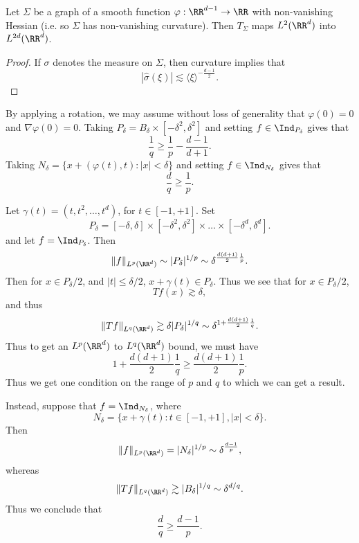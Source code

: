 \begin{theorem}
    Let $\Sigma$ be a graph of a smooth function $\varphi: \RR^{d-1} \to \RR$ with non-vanishing Hessian (i.e. so $\Sigma$ has non-vanishing curvature). Then $T_\Sigma$ maps $L^2(\RR^d)$ into $L^{2d}(\RR^d)$.
\end{theorem}
\begin{proof}
    If $\sigma$ denotes the measure on $\Sigma$, then curvature implies that
    \[ |\widehat{\sigma}(\xi)| \lesssim \langle \xi \rangle^{- \frac{d-1}{2}}. \]
\end{proof}

\begin{remark}
    By applying a rotation, we may assume without loss of generality that $\varphi(0) = 0$ and $\nabla \varphi(0) = 0$. Taking $P_\delta = B_\delta \times [-\delta^2, \delta^2]$ and setting $f \in \Ind_{P_\delta}$ gives that
    \[ \frac{1}{q} \geq \frac{1}{p} - \frac{d-1}{d+1}. \]
    Taking $N_\delta = \{ x + (\varphi(t),t) : |x| < \delta \}$ and setting $f \in \Ind_{N_\delta}$ gives that
    \[ \frac{d}{q} \geq \frac{1}{p}. \]
\end{remark}






\begin{example}
    Let $\gamma(t) = (t,t^2,\dots,t^d)$, for $t \in [-1,+1]$. Set
    \[ P_\delta = [-\delta,\delta] \times [-\delta^2,\delta^2] \times \dots \times [-\delta^d, \delta^d]. \]
    and let $f = \Ind_{P_\delta}$. Then
    \[ \| f \|_{L^p(\RR^d)} \sim |P_\delta|^{1/p} \sim \delta^{\frac{d(d+1)}{2} \frac{1}{p}}. \]
    Then for $x \in P_\delta / 2$, and $|t| \leq \delta / 2$, $x + \gamma(t) \in P_\delta$. Thus we see that for $x \in P_\delta / 2$,
    \[ Tf(x) \gtrsim \delta, \]
    and thus
    \[ \| Tf \|_{L^q(\RR^d)} \gtrsim \delta | P_\delta |^{1/q} \sim \delta^{1 + \frac{d(d+1)}{2} \frac{1}{q}}. \]
    Thus to get an $L^p(\RR^d)$ to $L^q(\RR^d)$ bound, we must have
    \[ 1 + \frac{d(d+1)}{2} \frac{1}{q} \geq \frac{d(d+1)}{2} \frac{1}{p}. \]
    Thus we get one condition on the range of $p$ and $q$ to which we can get a result.

    Instead, suppose that $f = \Ind_{N_\delta}$, where
    \[ N_\delta = \{ x + \gamma(t): t \in [-1,+1], |x| < \delta \}. \]
    Then
    \[ \| f \|_{L^p(\RR^d)} = |N_\delta|^{1/p} \sim \delta^{\frac{d-1}{p}}, \]
    whereas
    \[ \| Tf \|_{L^q(\RR^d)} \gtrsim |B_\delta|^{1/q} \sim \delta^{d/q}. \]
    Thus we conclude that
    \[ \frac{d}{q} \geq \frac{d-1}{p}. \]

\end{example}

